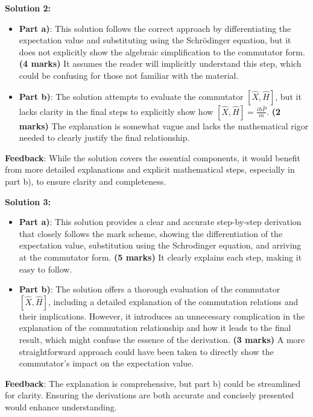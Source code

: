 \documentclass[a4paper,11pt]{article}
\begin{document}
\textbf{Solution 2:}

\begin{itemize}
    \item \textbf{Part a)}: This solution follows the correct approach by differentiating the expectation value and substituting using the Schr\"odinger equation, but it does not explicitly show the algebraic simplification to the commutator form. \textbf{(4 marks)} It assumes the reader will implicitly understand this step, which could be confusing for those not familiar with the material.
    
    \item \textbf{Part b)}: The solution attempts to evaluate the commutator \(\left[ \hat{X}, \hat{H}\right]\), but it lacks clarity in the final steps to explicitly show how \(\left[ \hat{X}, \hat{H}\right] = \frac{i\hbar\hat{P}}{m}\). \textbf{(2 marks)} The explanation is somewhat vague and lacks the mathematical rigor needed to clearly justify the final relationship.
\end{itemize}

\textbf{Feedback}: While the solution covers the essential components, it would benefit from more detailed explanations and explicit mathematical steps, especially in part b), to ensure clarity and completeness.

\textbf{Solution 3:}

\begin{itemize}
    \item \textbf{Part a)}: This solution provides a clear and accurate step-by-step derivation that closely follows the mark scheme, showing the differentiation of the expectation value, substitution using the Schrodinger equation, and arriving at the commutator form. \textbf{(5 marks)} It clearly explains each step, making it easy to follow.
    
    \item \textbf{Part b)}: The solution offers a thorough evaluation of the commutator \(\left[ \hat{X}, \hat{H}\right]\), including a detailed explanation of the commutation relations and their implications. However, it introduces an unnecessary complication in the explanation of the commutation relationship and how it leads to the final result, which might confuse the essence of the derivation. \textbf{(3 marks)} A more straightforward approach could have been taken to directly show the commutator’s impact on the expectation value.
\end{itemize}

\textbf{Feedback}: The explanation is comprehensive, but part b) could be streamlined for clarity. Ensuring the derivations are both accurate and concisely presented would enhance understanding.
\end{document}
